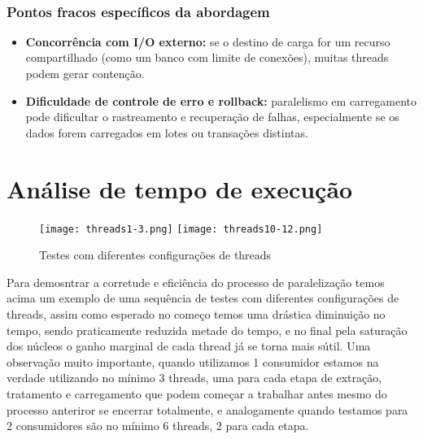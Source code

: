 \documentclass[a4paper,12pt]{article}
\begin{document}
\vspace{1em}

\\
\subsubsection*{Pontos fracos específicos da abordagem}

\begin{itemize}
    \item \textbf{Concorrência com I/O externo:} se o destino de carga for um recurso compartilhado (como um banco com limite de conexões), muitas threads podem gerar contenção.

    \item \textbf{Dificuldade de controle de erro e rollback:} paralelismo em carregamento pode dificultar o rastreamento e recuperação de falhas, especialmente se os dados forem carregados em lotes ou transações distintas.


\end{itemize}

\section{Análise de tempo de execução}

\begin{figure}[H]
    \centering
    \texttt{[image: threads1-3.png]} 
    \texttt{[image: threads10-12.png]} 
    \caption{Testes com diferentes configurações de threads}
    \label{fig:example}
\end{figure}


Para demosntrar a corretude e eficiência do processo de paralelização temos acima um exemplo de uma sequência de testes com diferentes configurações de threads, assim como esperado no começo temos uma drástica diminuição no tempo, sendo praticamente reduzida metade do tempo, e no final pela saturação dos núcleos o ganho marginal de cada thread já se torna mais sútil. Uma observação muito importante, quando utilizamos 1 consumidor estamos na verdade utilizando no mínimo 3 threads, uma para cada etapa de extração, tratamento e carregamento que podem começar a trabalhar antes mesmo do processo anteriror se encerrar totalmente, e analogamente quando testamos para 2 consumidores são no mínimo 6 threads, 2 para cada etapa.
\end{document}
